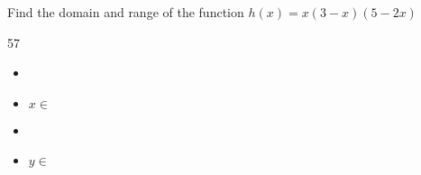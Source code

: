 \myProblemWithContent 
{
    Find the domain and range of the function 
    $h(x) = x (3-x) (5-2x) $
    \\
    \begin{minipage}{0.39\textwidth}
        \begin{myTikzpictureGrid}{0.29} {5}{7} 
        \end{myTikzpictureGrid}
    \end{minipage}
    \hfill
    \begin{minipage}{0.55\textwidth}
        \small
        \begin{itemize}[fullwidth,nosep]
            \item {}
            \item $x \in $ \gap{$(-\infty,\infty)$}
        \end{itemize}
        \vspace{1em}
        \begin{itemize}[fullwidth,nosep]
            \item {}
            \item $y \in $ \gap{$(-\infty,\infty)$}
        \end{itemize}
    \end{minipage}
}